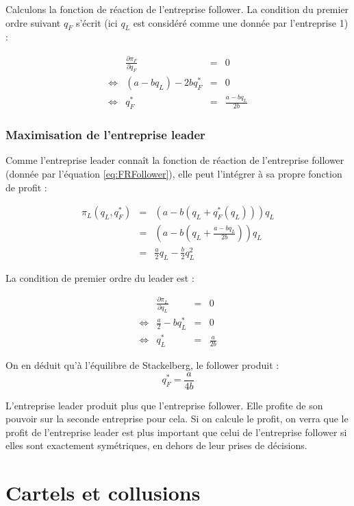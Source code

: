 \documentclass[
]{book}
\theoremstyle{definition}
\theoremstyle{definition}
\theoremstyle{definition}
\theoremstyle{definition}
\theoremstyle{remark}
\begin{document}
Calculons la fonction de réaction de l'entreprise follower.
La condition du premier ordre suivant \(q_F\) s'écrit (ici \(q_L\) est considéré comme une donnée par l'entreprise 1) :

\[
\begin{array}{crcl}
&\frac{\partial \pi_F}{\partial q_F}&=&0\\
\Leftrightarrow & (a-bq_L)-2bq_F^* &=& 0\\
\Leftrightarrow & q_F^* &=& \frac{a-bq_L}{2b}
\label{eq:FRFollower}
\end{array}
\]

\hypertarget{maximisation-de-lentreprise-leader}{%
\subsubsection{Maximisation de l'entreprise leader}\label{maximisation-de-lentreprise-leader}}

Comme l'entreprise leader connaît la fonction de réaction de l'entreprise follower (donnée par l'équation \eqref{eq:FRFollower}), elle peut l'intégrer à sa propre fonction de profit :

\[
\begin{array}{rcl}
\pi_L(q_L, q_F^*) &=& \left(a-b(q_L+q_F^*(q_L))\right)q_L\\
 &=& \left(a-b\left(q_L+\frac{a-bq_L}{2b}\right)\right)q_L\\
 &=& \frac{a}{2}q_L-\frac{b}{2}q_L^2
\end{array}
\]

La condition de premier ordre du leader est :

\[
\begin{array}{crcl}
&\frac{\partial \pi_L}{\partial q_L}&=&0\\
\Leftrightarrow & \frac{a}{2}-bq_L^* &=& 0\\
\Leftrightarrow & q_L^* &=& \frac{a}{2b}
\end{array}
\]

On en déduit qu'à l'équilibre de Stackelberg, le follower produit :
\[
q_F^*=\frac{a}{4b}
\]

L'entreprise leader produit plus que l'entreprise follower.
Elle profite de son pouvoir sur la seconde entreprise pour cela.
Si on calcule le profit, on verra que le profit de l'entreprise leader est plus important que celui de l'entreprise follower si elles sont exactement symétriques, en dehors de leur prises de décisions.

\hypertarget{cartels-et-collusions}{%
\section{Cartels et collusions}\label{cartels-et-collusions}}
\end{document}
